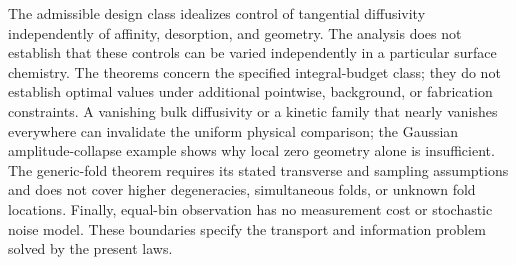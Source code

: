 The admissible design class idealizes control of tangential diffusivity
independently of affinity, desorption, and geometry. The analysis does
not establish that these controls can be varied independently in a
particular surface chemistry. The theorems concern the specified
integral-budget class; they do not establish optimal values under
additional pointwise, background, or fabrication constraints.
A vanishing bulk diffusivity or a
kinetic family that nearly vanishes everywhere can invalidate the
uniform physical comparison; the Gaussian amplitude-collapse example
shows why local zero geometry alone is insufficient. The generic-fold
theorem requires its stated transverse and sampling assumptions and
does not cover higher degeneracies, simultaneous folds, or unknown
fold locations. Finally, equal-bin observation has no measurement
cost or stochastic noise model. These boundaries specify the transport
and information problem solved by the present laws.
